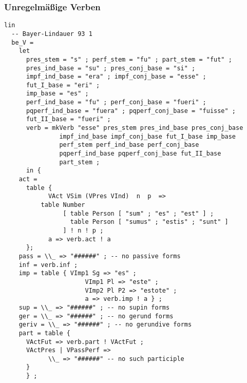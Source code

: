\subsubsection{Unregelmäßige Verben}
\begin{lstlisting}[float=h!tp,caption={Regel um das Paradigma für unregelmäßige Verb \textit{esse} zu erzeugen (vgl. \textbf{IrregLat.gf})},label={GF-Irreg-Be},basicstyle=\small]
lin
  -- Bayer-Lindauer 93 1
  be_V =
    let
      pres_stem = "s" ; perf_stem = "fu" ; part_stem = "fut" ;
      pres_ind_base = "su" ; pres_conj_base = "si" ;
      impf_ind_base = "era" ; impf_conj_base = "esse" ;
      fut_I_base = "eri" ;
      imp_base = "es" ;
      perf_ind_base = "fu" ; perf_conj_base = "fueri" ;
      pqperf_ind_base = "fuera" ; pqperf_conj_base = "fuisse" ;
      fut_II_base = "fueri" ;
      verb = mkVerb "esse" pres_stem pres_ind_base pres_conj_base
               impf_ind_base impf_conj_base fut_I_base imp_base 
               perf_stem perf_ind_base perf_conj_base 
               pqperf_ind_base pqperf_conj_base fut_II_base 
               part_stem ;
      in {
	act = 
	  table {
    	    VAct VSim (VPres VInd)  n  p  => 
	      table Number 
                [ table Person [ "sum" ; "es" ; "est" ] ;
                  table Person [ "sumus" ; "estis" ; "sunt" ]
    	        ] ! n ! p ;
    	    a => verb.act ! a
	  };
	pass = \\_ => "######" ; -- no passive forms 
	inf = verb.inf ;
	imp = table { VImp1 Sg => "es" ;
                      VImp1 Pl => "este" ;
                      VImp2 Pl P2 => "estote" ;
                      a => verb.imp ! a } ;
	sup = \\_ => "######" ; -- no supin forms
	ger = \\_ => "######" ; -- no gerund forms
	geriv = \\_ => "######" ; -- no gerundive forms
	part = table {
	  VActFut => verb.part ! VActFut ;
	  VActPres | VPassPerf => 
            \\_ => "######" -- no such participle
	  }
      } ;
\end{lstlisting}
